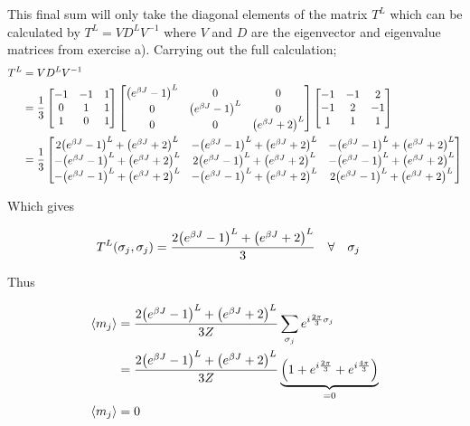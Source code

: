 \documentclass[12pt]{article}
\begin{document}
This final sum will only take the diagonal elements of the matrix $T^L$ which
can be calculated by $T^L = VD^LV^{-1}$ where $V$ and $D$ are the eigenvector
and eigenvalue matrices from exercise a). Carrying out the full calculation;
\begin{align*}
    T^L &= VD^LV^{-1} \\
    &= \frac{1}{3} \begin{bmatrix}-1&-1&1\\0&1&1\\1&0&1\end{bmatrix}
        \begin{bmatrix}\qty(e^{\beta J}-1)^L&0&0\\0&\qty(e^{\beta J}-1)^L&0
        \\0&0&\qty(e^{\beta J}+2)^L\end{bmatrix}
        \begin{bmatrix}-1&-1&2\\-1&2&-1\\1&1&1\end{bmatrix} \\
    &= \frac{1}{3}
    \begin{bmatrix}2\qty(e^{\beta J}-1)^L + \qty(e^{\beta J}+2)^L &
    -\qty(e^{\beta J}-1)^L + \qty(e^{\beta J}+2)^L & -\qty(e^{\beta J}-1)^L +
    \qty(e^{\beta J}+2)^L \\ -\qty(e^{\beta J}-1)^L + \qty(e^{\beta J}+2)^L &
    2\qty(e^{\beta J}-1)^L + \qty(e^{\beta J}+2)^L & -\qty(e^{\beta J}-1)^L +
    \qty(e^{\beta J}+2)^L \\ -\qty(e^{\beta J}-1)^L + \qty(e^{\beta J}+2)^L &
    -\qty(e^{\beta J}-1)^L + \qty(e^{\beta J}+2)^L & 2\qty(e^{\beta J}-1)^L + \qty(e^{\beta J}+2)^L\end{bmatrix}
\end{align*}

Which gives

\begin{align*}
    T^L\qty(\sigma_j, \sigma_j) &= \frac{2\qty(e^{\beta J}-1)^L + \qty(e^{\beta
    J}+2)^L}{3} \quad \forall \quad \sigma_j
\end{align*}

Thus

\begin{align*}
    \expval{m_j} &=
    \frac{2\qty(e^{\beta J}-1)^L + \qty(e^{\beta
    J}+2)^L}{3Z}\sum_{\sigma_j}e^{i\frac{2\pi}{3}\sigma_j} \\
    &= \frac{2\qty(e^{\beta J}-1)^L + \qty(e^{\beta
    J}+2)^L}{3Z} \underbrace{\qty(1 + e^{i\frac{2\pi}{3}} +
    e^{i\frac{4\pi}{3}})}_{=0} \\
    \expval{m_j} &= 0
\end{align*}
\end{document}
